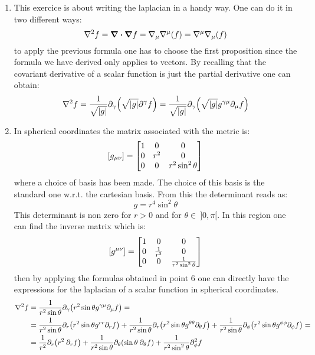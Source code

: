 \documentclass[11pt, oneside]{article}
\begin{document}
\begin{enumerate}
\item This exercice is about writing the laplacian in a handy way. One can do it in two different ways:
\[
	\laplacian f = \div \grad f = \nabla_\mu \nabla^\mu \qty(f) = \nabla^\mu \nabla_\mu \qty(f)
\]
to apply the previous formula one has to choose the first proposition since the formula we have derived only applies to vectors. By recalling that the covariant derivative of a scalar function is just the partial derivative one can obtain:
\[
	\laplacian f = \frac{1}{\sqrt{|g|}} \partial_{\gamma}\qty(\sqrt{|g|} \partial^\gamma f) = \frac{1}{\sqrt{|g|}} \partial_{\gamma}\qty(\sqrt{|g|} g^{\gamma\mu}\partial_\mu f)
\]

\item In spherical coordinates the matrix associated with the metric is:
\[
	\qty[g_{\mu\nu}] = 
	\begin{bmatrix} 
	1 & 0 & 0 \\
	0 & r^2 & 0 \\
	0 & 0 & r^2 \sin^2 \theta
	\end{bmatrix}
\]
where a choice of basis has been made. The choice of this basis is the standard one w.r.t. the cartesian basis. From this the determinant reads as:
\[
	g = r^4 \sin^2 \theta
\]
This determinant is non zero for $r>0$ and for $\theta \in \:]0, \pi[$. In this region one can find the inverse matrix which is:
\[
	\qty[g^{\mu\nu}] = 
	\begin{bmatrix} 
	1 & 0 & 0 \\
	0 & \frac{1}{r^2} & 0 \\
	0 & 0 & \frac{1}{r^2 \sin^2 \theta}
	\end{bmatrix}
\]
then by applying the formulas obtained in point 6 one can directly have the expressions for the laplacian of a scalar function in spherical coordinates.
\begin{align*}
	\laplacian f &= \frac{1}{r^2\sin\theta} \partial_\gamma\qty( r^2\sin\theta  g^{\gamma\mu}\partial_\mu f) = \\
	&= \frac{1}{r^2\sin\theta} \partial_r \qty(r^2\sin\theta g^{rr} \partial_r f) + \frac{1}{r^2\sin\theta} \partial_r \qty(r^2\sin\theta g^{\theta\theta} \partial_\theta f) + \frac{1}{r^2\sin\theta} \partial_\phi \qty(r^2\sin\theta g^{\phi\phi} \partial_\phi f) = \\
	&= \frac{1}{r^2} \partial_r \qty( r^2 \:\partial_r f ) + \frac{1}{r^2 \sin\theta} \partial_\theta \qty( \sin\theta \:\partial_\theta f ) + \frac{1}{r^2\sin^2\theta}\partial_\phi^2 f
\end{align*}


\end{enumerate}
\end{document}

